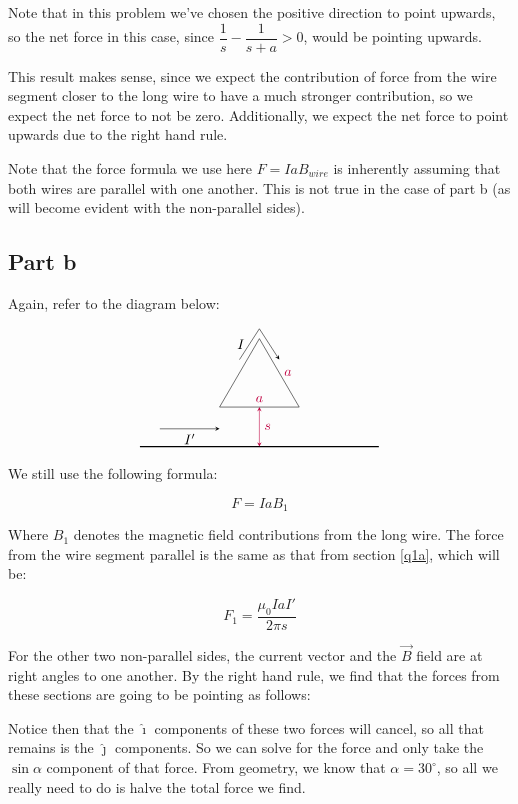 \documentclass{article}
\theoremstyle{definition}
\numberwithin{equation}{section}
\numberwithin{definition}{section}
\begin{document}
Note that in this problem we've chosen the positive direction to point upwards, so the net force in this case, since $\dfrac{1}{s} - \dfrac{1}{s+a} > 0$, would be pointing upwards. 

This result makes sense, since we expect the contribution of force from the wire segment closer to the long wire to have a much stronger contribution, so we expect the net force to not be zero. Additionally, we expect the net force to point upwards due to the right hand rule.

\begin{remark}
  Note that the force formula we use here $F = IaB_{wire}$ is inherently assuming that both wires are parallel with one another. This is not true in the case of part b (as will become evident with the non-parallel sides).
\end{remark}
\subsection{Part b}

Again, refer to the diagram below:

$$\begin{tikzpicture}
    \draw[thick] (-3,-1) -- (3,-1);
    \draw (-1,0) -- (1,0) node[midway, above, color=purple] {$a$} -- (0,1.73) node[midway, right, color=purple] {$a$} -- cycle;
    \draw[-stealth] (-2.5,-0.55) -- (-1,-0.55) node[midway, below] {$I'$};
    \draw[stealth-stealth, color=purple] (0,-1) -- (0,0) node[midway, right] {$s$};
    \draw[-stealth] (-0.5, 1.2) -- (0,1.98) node[midway, left] {$I$} -- (0.5, 1.2);
  \end{tikzpicture}$$

We still use the following formula:

\[ F = I a B_1\]

Where $B_1$ denotes the magnetic field contributions from the long wire. The force from the wire segment parallel is the same as that from section \ref{q1a}, which will be:

\[ F_1 = \frac{\mu_0 IaI'}{2\pi s}\]

For the other two non-parallel sides, the current vector and the $\vec{B}$ field are at right angles to one another. By the right hand rule, we find that the forces from these sections are going to be pointing as follows:


Notice then that the $\hat \imath$ components of these two forces will cancel, so all that remains is the $\hat \jmath$ components. So we can solve for the force and only take the $\sin \alpha$ component of that force. From geometry, we know that $\alpha = 30^\circ$, so all we really need to do is halve the total force we find.
\end{document}
